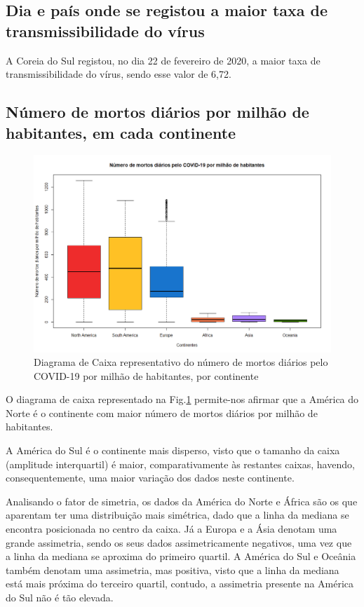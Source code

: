 \documentclass[conference]{IEEEtran}
\begin{document}
\subsection{Dia e país onde se registou a maior taxa de transmissibilidade do vírus}
A Coreia do Sul registou, no dia 22 de fevereiro de 2020, a maior taxa de transmissibilidade do vírus, sendo esse valor de 6,72. 

\subsection{Número de mortos diários por milhão de habitantes, em cada continente}

\begin{figure}[htbp]
\centerline{\includegraphics[width=0.95\columnwidth]{images/01.g.png}}
\caption{Diagrama de Caixa representativo do número de mortos diários pelo COVID-19 por milhão de habitantes, por continente}
\label{1g}
\end{figure}

O diagrama de caixa representado na Fig.\ref{1g} permite-nos afirmar que a América do Norte é o continente com maior número de mortos diários por milhão de habitantes.

A América do Sul é o continente mais disperso, visto que o tamanho da caixa (amplitude interquartil) é maior, comparativamente às restantes caixas, havendo, consequentemente, uma maior variação dos dados neste continente.

Analisando o fator de simetria, os dados da América do Norte e África são os que aparentam ter uma distribuição mais simétrica, dado que a linha da mediana se encontra posicionada no centro da caixa. Já a Europa e a Ásia denotam uma grande assimetria, sendo os seus dados assimetricamente negativos, uma vez que a linha da mediana se aproxima do primeiro quartil. A América do Sul e Oceânia também denotam uma assimetria, mas positiva, visto que a linha da mediana está mais próxima do terceiro quartil, contudo, a assimetria presente na América do Sul não é tão elevada.
\end{document}
